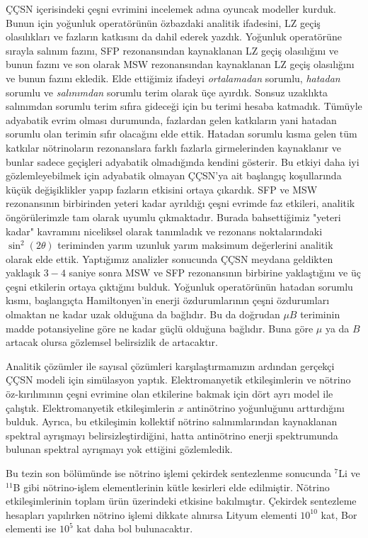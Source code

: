 ÇÇSN içerisindeki çeşni evrimini incelemek adına oyuncak modeller kurduk. Bunun için yoğunluk operatörünün özbazdaki analitik ifadesini, LZ geçiş olasılıkları ve fazların katkısını da dahil ederek yazdık. Yoğunluk operatörüne sırayla salınım fazını, SFP rezonansından kaynaklanan LZ geçiş olasılığını ve bunun fazını ve son olarak MSW rezonansından kaynaklanan LZ geçiş olasılığını ve bunun fazını ekledik. Elde ettiğimiz ifadeyi \emph{ortalamadan} sorumlu, \emph{hatadan} sorumlu ve \emph{salınımdan} sorumlu terim  olarak üçe ayırdık. Sonsuz uzaklıkta salınımdan sorumlu terim sıfıra gideceği için bu terimi hesaba katmadık. Tümüyle adyabatik evrim olması durumunda, fazlardan gelen katkıların yani hatadan sorumlu olan terimin sıfır olacağını elde ettik. Hatadan sorumlu kısma gelen tüm katkılar nötrinoların rezonanslara farklı fazlarla girmelerinden kaynaklanır ve bunlar sadece geçişleri adyabatik olmadığında kendini gösterir. Bu etkiyi daha iyi gözlemleyebilmek için adyabatik olmayan ÇÇSN'ya ait başlangıç koşullarında küçük değişiklikler yapıp fazların etkisini ortaya çıkardık. SFP ve MSW rezonansının birbirinden yeteri kadar ayrıldığı çeşni evrimde faz etkileri, analitik öngörülerimzle tam olarak uyumlu çıkmaktadır. Burada bahsettiğimiz "yeteri kadar" kavramını niceliksel olarak tanımladık ve rezonans noktalarındaki $ \sin^{2}(2\theta) $ teriminden yarım uzunluk yarım maksimum değerlerini analitik olarak elde ettik. Yaptığımız analizler sonucunda ÇÇSN meydana geldikten yaklaşık $ 3-4 $ saniye sonra MSW ve SFP rezonansının birbirine yaklaştığını ve üç çeşni etkilerin ortaya çıktığını bulduk. Yoğunluk operatörünün hatadan sorumlu kısmı, başlangıçta Hamiltonyen'in enerji özdurumlarının çeşni özdurumları olmaktan ne kadar uzak olduğuna da bağlıdır. Bu da doğrudan $ \mu B $ teriminin madde potansiyeline göre ne kadar güçlü olduğuna bağlıdır. Buna göre $ \mu $ ya da $ B $ artacak olursa gözlemsel belirsizlik de artacaktır.

Analitik çözümler ile sayısal çözümleri karşılaştırmamızın ardından gerçekçi ÇÇSN modeli için simülasyon yaptık. Elektromanyetik etkileşimlerin ve nötrino öz-kırılımının çeşni evrimine olan etkilerine bakmak için dört ayrı model ile çalıştık. Elektromanyetik etkileşimlerin $ x $ antinötrino yoğunluğunu arttırdığını bulduk. Ayrıca, bu etkileşimin kollektif nötrino salınımlarından kaynaklanan spektral ayrışmayı belirsizleştirdiğini, hatta antinötrino enerji spektrumunda bulunan spektral ayrışmayı yok ettiğini gözlemledik.

Bu tezin son bölümünde ise nötrino işlemi çekirdek sentezlenme sonucunda $ ^{7} $Li ve $ ^{11} $B gibi nötrino-işlem elementlerinin kütle kesirleri elde edilmiştir. Nötrino etkileşimlerinin toplam ürün üzerindeki etkisine bakılmıştır. Çekirdek sentezleme hesapları yapılırken nötrino işlemi dikkate alınırsa Lityum elementi $ 10^{10} $ kat, Bor elementi ise $ 10^{5} $ kat daha bol bulunacaktır.

